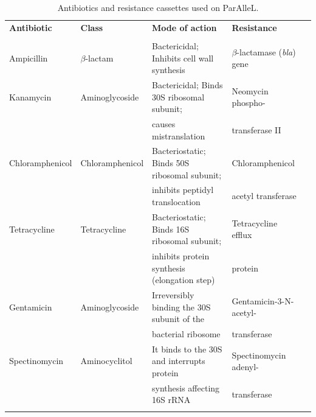 \begin{table}
\caption{Antibiotics and resistance cassettes used on ParAlleL.\\}
\label{table:12}%
{%
\begin{tabular*}{\columnwidth}{@{}lllll@{}}
\hline
\textbf{Antibiotic} & \textbf{Class} & \textbf{Mode of action} & \textbf{Resistance}   \\
 & &  & 
\\
\hline
Ampicillin & $\beta$-lactam & Bactericidal; Inhibits  cell  wall synthesis & $\beta$-lactamase (\textit{bla}) gene \\
Kanamycin  & Aminoglycoside & Bactericidal; Binds 30S ribosomal subunit;  & Neomycin phospho-\\
  &  & causes mistranslation & transferase II   \\
Chloramphenicol & Chloramphenicol & Bacteriostatic;    Binds    50S ribosomal subunit; & Chloramphenicol\\
 &  & inhibits peptidyl translocation & acetyl transferase \\
Tetracycline  & Tetracycline & Bacteriostatic;    Binds    16S ribosomal subunit; & Tetracycline efflux \\
  &  & inhibits protein synthesis (elongation step)  & protein  \\
Gentamicin & Aminoglycoside & Irreversibly binding the 30S subunit of the & Gentamicin-3-N-acetyl-\\
 &  & bacterial ribosome &  transferase \\
Spectinomycin & Aminocyclitol & It binds to the 30S and interrupts protein & Spectinomycin adenyl-\\
 &  & synthesis  affecting  16S rRNA & transferase \\
\\
\hline
\hline
\end{tabular*}
}
\\
{
}
\end{table}


